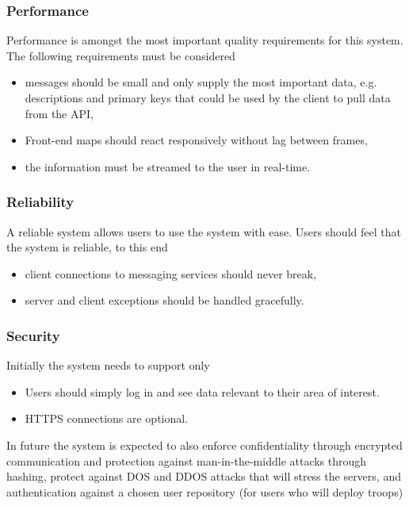 \subsubsection{Performance}
Performance is amongst the most important quality requirements for this system. The following requirements must be considered
\begin{itemize}
\item messages should be small and only supply the most important data, e.g. descriptions and primary keys that could be used by the client to pull data from the API,
\item Front-end maps should react responsively without lag between frames, 
\item the information must be streamed to the user in real-time.
\end{itemize}

\subsubsection{Reliability}
A reliable system allows users to use the system with ease. Users should feel that the system is reliable, to this end
\begin{itemize}
\item client connections to messaging services should never break,
\item server and client exceptions should be handled gracefully.
\end{itemize}

\subsubsection{Security}
Initially the system needs to support only
\begin{itemize}
	\item Users should simply log in and see data relevant to their area of interest. 
	\item HTTPS connections are optional.	
\end{itemize}
In future the system is expected to also enforce confidentiality through encrypted communication and protection against man-in-the-middle attacks through hashing, protect against DOS and DDOS attacks that will stress the servers, and authentication against a chosen user repository (for users who will deploy troops) 

